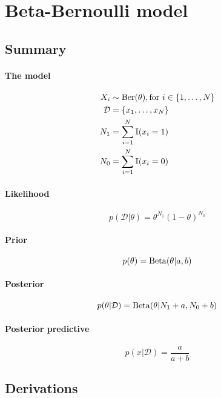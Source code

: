 \section{Beta-Bernoulli model}
\subsection{Summary}
\paragraph{The model}
    \begin{align}
        X_i         &\sim \operatorname{Ber}(\theta), \text{for } i \in \{1, \dotsc, N\} \\
        \mathcal D  &= \{x_1, \dotsc, x_N\} \\
        N_1         &= \sum_{i = 1}^N \mathbb I (x_i = 1) \\
        N_0         &= \sum_{i = 1}^N \mathbb I (x_i = 0)
    \end{align}

\paragraph{Likelihood}
    \begin{equation}
        p(\mathcal D | \theta) = \theta^{N_1} (1 - \theta)^{N_0}
    \end{equation}

\paragraph{Prior}
    \begin{equation}
        p(\theta)   = \operatorname{Beta}(\theta | a, b)
    \end{equation}

\paragraph{Posterior}
    \begin{equation}
        p(\theta | \mathcal D) = \operatorname{Beta}(\theta | N_1 + a, N_0 + b)
    \end{equation}

\paragraph{Posterior predictive}
    \begin{equation}
        p(x | \mathcal D) = \frac{a}{a + b}
    \end{equation}

\subsection{Derivations}

